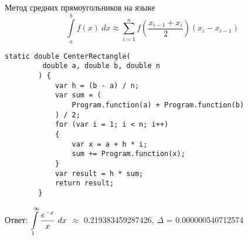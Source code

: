 \def \itemtitle {Метод средних прямоугольников на языке \textit \Csh}

\item 
	\itemtitle
	 \[ \displaystyle \int \limits_{a}^{b} {f(x) ~ dx} 
	 \approx \sum\limits_{i=1}^{n} f\left(\dfrac{x_{i-1} + x_{i}}{2}\right)( x_i - x_{i-1}) \]

	\begin{lstlisting}[caption=\itemtitle]
		static double CenterRectangle(
		 double a, double b, double n
		) {
			var h = (b - a) / n;
			var sum = (
				Program.function(a) + Program.function(b)
			) / 2;
			for (var i = 1; i < n; i++)
			{
				var x = a + h * i;
				sum += Program.function(x);
			}
			var result = h * sum;
			return result;
		}
	\end{lstlisting}
	Ответ: $\displaystyle \int\limits_1^{\infty} {\frac{ e^{-x} }{ x } ~ dx}$ $\approx$ 0.219383459287426, $\Delta$ = 0.000000540712574